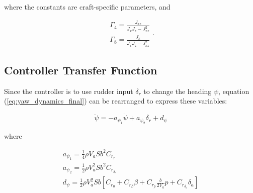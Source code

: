 where the constants are craft-specific parameters, and

\begin{equation}
\begin{gathered}
	\Gamma_4 = \frac{J_{xz}}{J_xJ_z-J_{xz}^2}
	\\
	\Gamma_8 = \frac{J_x}{J_xJ_z-J_{xz}^2}
\end{gathered}
.
\end{equation}


\subsection{Controller Transfer Function}
Since the controller is to use rudder input $\delta_r$ to change the heading $\psi$, equation (\ref{eq:yaw_dynamics_final}) can be rearranged to express these variables:

\begin{equation}
	\ddot{\psi} = -a_{\psi_1}\dot{\psi} + a_{\psi_2}\delta_r + d_\psi
\end{equation}

where

\begin{equation}
\begin{gathered}
	a_{\psi_1} = \frac{1}{4}\rho V_aSb^2C_{r_r}
	\\
	a_{\psi_2} = \frac{1}{2}\rho V_a^2Sb^2C_{r_{\delta_r}}
	\\
	d_\psi = \frac{1}{2}\rho V_a^2Sb[C_{r_0} + C_{r_\beta}\beta + C_{r_p}\frac{b}{2V_a}p + C_{r_{\delta_a}}\delta_a]
\end{gathered}
\end{equation}
